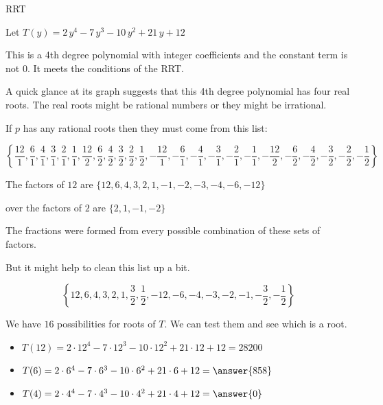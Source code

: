 \documentclass{ximera}
\begin{document}
\begin{example} RRT


Let $T(y) = 2\, y^4 - 7 \, y^3 - 10 \, y^2 + 21 \, y + 12$ 


This is a 4th degree polynomial with integer coefficients and the constant term is not $0$. It meets the conditions of the RRT.


A quick glance at its graph suggests that this 4th degree polynomial has four real roots. The real roots might be rational numbers or they might be irrational.

If $p$ has any rational roots then they must come from this list:




\[
\left\{  \frac{12}{1},  \frac{6}{1}, \frac{4}{1}, \frac{3}{1}, \frac{2}{1}, \frac{1}{1}, \frac{12}{2},  \frac{6}{2}, \frac{4}{2}, \frac{3}{2}, \frac{2}{2}, \frac{1}{2},  -\frac{12}{1},  -\frac{6}{1}, -\frac{4}{1}, -\frac{3}{1}, -\frac{2}{1}, -\frac{1}{1}, -\frac{12}{2},  -\frac{6}{2}, -\frac{4}{2}, -\frac{3}{2}, -\frac{2}{2}, -\frac{1}{2}                 \right\}
\]


The factors of $12$ are $\{ 12, 6, 4, 3, 2, 1, -1, -2, -3, -4, -6, -12 \}$ 

over the factors of $2$ are $\{ 2, 1, -1, -2 \}$ 


The fractions were formed from every possible combination of these sets of factors.

But it might help to clean this list up a bit.

\[
\left\{  12,  6, 4, 3, 2, 1,  \frac{3}{2},  \frac{1}{2},  -12,  -6, -4, -3, -2, -1,  -\frac{3}{2},  -\frac{1}{2}                 \right\}
\]





We have $16$ possibilities for roots of $T$.  We can test them and see which is a root.










\begin{itemize}
\item $T(12) =  2 \cdot 12^4 - 7 \cdot 12^3 - 10 \cdot 12^2 + 21 \cdot 12 + 12 = 28200$ 
\item $T(6) =  2 \cdot 6^4 - 7 \cdot 6^3 - 10 \cdot 6^2 + 21 \cdot 6 + 12 = \answer{858}$  
\item $T(4) =  2 \cdot 4^4 - 7 \cdot 4^3 - 10 \cdot 4^2 + 21 \cdot 4 + 12 = \answer{0}$  
\end{itemize}



\end{example}
\end{document}
